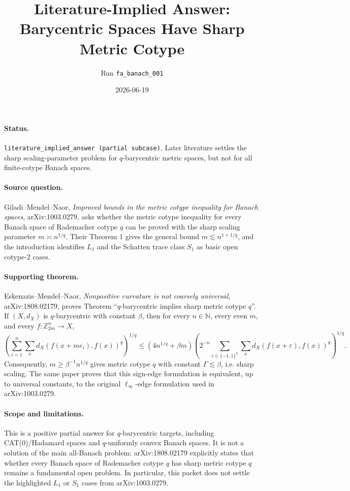 \documentclass[11pt]{article}
\title{Literature-Implied Answer: Barycentric Spaces Have Sharp Metric Cotype}
\author{Run \texttt{fa\_banach\_001}}
\date{2026-06-19}
\begin{document}
\maketitle

\paragraph{Status.}
\texttt{literature\_implied\_answer (partial subcase)}.  Later literature
settles the sharp scaling-parameter problem for \(q\)-barycentric metric
spaces, but not for all finite-cotype Banach spaces.

\paragraph{Source question.}
Giladi--Mendel--Naor, \emph{Improved bounds in the metric cotype inequality
for Banach spaces}, arXiv:1003.0279, asks whether the metric cotype inequality
for every Banach space of Rademacher cotype \(q\) can be proved with the sharp
scaling parameter \(m\asymp n^{1/q}\).  Their Theorem 1 gives the general
bound \(m\lesssim n^{1+1/q}\), and the introduction identifies \(L_1\) and
the Schatten trace class \(S_1\) as basic open cotype-2 cases.

\paragraph{Supporting theorem.}
Eskenazis--Mendel--Naor, \emph{Nonpositive curvature is not coarsely
universal}, arXiv:1808.02179, proves Theorem ``\(q\)-barycentric implies sharp
metric cotype \(q\)''.  If \((X,d_X)\) is \(q\)-barycentric with constant
\(\beta\), then for every \(n\in\mathbb N\), every even \(m\), and every
\(f:\mathbb Z_{2m}^{n}\to X\),
\[
\left(\sum_{i=1}^n\sum_x d_X(f(x+me_i),f(x))^q\right)^{1/q}
\le (4n^{1/q}+\beta m)
\left(2^{-n}\sum_{\varepsilon\in\{-1,1\}^n}\sum_x
d_X(f(x+\varepsilon),f(x))^q\right)^{1/q}.
\]
Consequently, \(m\ge \beta^{-1}n^{1/q}\) gives metric cotype \(q\) with
constant \(\Gamma\lesssim\beta\), i.e. sharp scaling.  The same paper proves
that this sign-edge formulation is equivalent, up to universal constants, to
the original \(\ell_\infty\)-edge formulation used in arXiv:1003.0279.

\paragraph{Scope and limitations.}
This is a positive partial answer for \(q\)-barycentric targets, including
CAT(0)/Hadamard spaces and \(q\)-uniformly convex Banach spaces.  It is not a
solution of the main all-Banach problem: arXiv:1808.02179 explicitly states
that whether every Banach space of Rademacher cotype \(q\) has sharp metric
cotype \(q\) remains a fundamental open problem.  In particular, this packet
does not settle the highlighted \(L_1\) or \(S_1\) cases from arXiv:1003.0279.
\end{document}

